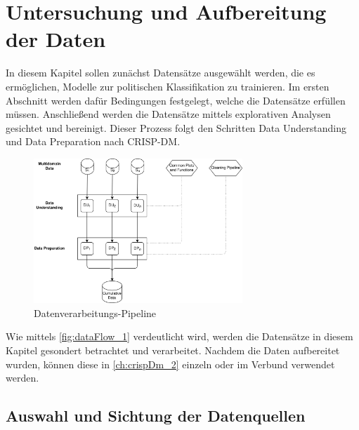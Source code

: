 
\chapter{Untersuchung und Aufbereitung der Daten} \label{ch:crispDm_1}

In diesem Kapitel sollen zunächst Datensätze ausgewählt werden, die es ermöglichen, Modelle zur politischen Klassifikation zu trainieren. Im ersten Abschnitt werden dafür Bedingungen festgelegt, welche die Datensätze erfüllen müssen. Anschließend werden die Datensätze mittels explorativen Analysen gesichtet und bereinigt. Dieser Prozess folgt den Schritten Data Understanding und Data Preparation nach \ac{CRISP-DM}.

\begin{figure}[H]
    \centering
    \includegraphics[width=0.7\textwidth]{data/images/data_flow_v2_1.png}
    \caption[Datenverarbeitungs-Pipeline]{Datenverarbeitungs-Pipeline} \label{fig:dataFlow_1}
\end{figure}

Wie mittels \autoref{fig:dataFlow_1} verdeutlicht wird, werden die Datensätze in diesem Kapitel gesondert betrachtet und verarbeitet. Nachdem die Daten aufbereitet wurden, können diese in \autoref{ch:crispDm_2} einzeln oder im Verbund verwendet werden.

\section{Auswahl und Sichtung der Datenquellen} \label{sec:dataUnderstanding}

